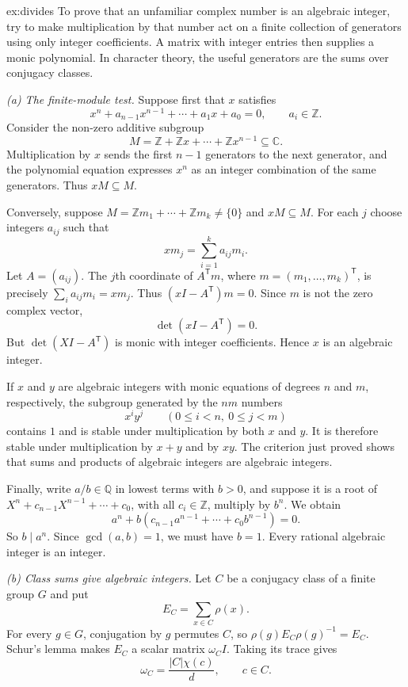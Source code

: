 \begin{solution}{ex:divides}
\idea To prove that an unfamiliar complex number is an algebraic integer, try to make multiplication by that number act on a finite collection of generators using only integer coefficients. A matrix with integer entries then supplies a monic polynomial. In character theory, the useful generators are the sums over conjugacy classes.

\writeup \emph{(a) The finite-module test.}
Suppose first that $x$ satisfies
\[
x^n+a_{n-1}x^{n-1}+\cdots+a_1x+a_0=0,
\qquad a_i\in\mathbb Z.
\]
Consider the non-zero additive subgroup
\[
M=\mathbb Z+\mathbb Zx+\cdots+\mathbb Zx^{n-1}\subseteq\mathbb C.
\]
Multiplication by $x$ sends the first $n-1$ generators to the next generator, and the polynomial equation expresses $x^n$ as an integer combination of the same generators. Thus $xM\subseteq M$.

Conversely, suppose $M=\mathbb Zm_1+\cdots+\mathbb Zm_k\ne\{0\}$ and $xM\subseteq M$. For each $j$ choose integers $a_{ij}$ such that
\[
xm_j=\sum_{i=1}^k a_{ij}m_i.
\]
Let $A=(a_{ij})$. The $j$th coordinate of $A^{\mathsf T}m$, where $m=(m_1,\ldots,m_k)^{\mathsf T}$, is precisely $\sum_i a_{ij}m_i=xm_j$. Thus $(xI-A^{\mathsf T})m=0$. Since $m$ is not the zero complex vector,
\[
\det(xI-A^{\mathsf T})=0.
\]
But $\det(XI-A^{\mathsf T})$ is monic with integer coefficients. Hence $x$ is an algebraic integer.

If $x$ and $y$ are algebraic integers with monic equations of degrees $n$ and $m$, respectively, the subgroup generated by the $nm$ numbers
\[
x^iy^j\qquad(0\le i<n,\ 0\le j<m)
\]
contains $1$ and is stable under multiplication by both $x$ and $y$. It is therefore stable under multiplication by $x+y$ and by $xy$. The criterion just proved shows that sums and products of algebraic integers are algebraic integers.

Finally, write $a/b\in\mathbb Q$ in lowest terms with $b>0$, and suppose it is a root of
$X^n+c_{n-1}X^{n-1}+\cdots+c_0$, with all $c_i\in\mathbb Z$, multiply by $b^n$. We obtain
\[
a^n+b(c_{n-1}a^{n-1}+\cdots+c_0b^{n-1})=0.
\]
So $b\mid a^n$. Since $\gcd(a,b)=1$, we must have $b=1$. Every rational algebraic integer is an integer.

\emph{(b) Class sums give algebraic integers.}
Let $C$ be a conjugacy class of a finite group $G$ and put
\[
E_C=\sum_{x\in C}\rho(x).
\]
For every $g\in G$, conjugation by $g$ permutes $C$, so $\rho(g)E_C\rho(g)^{-1}=E_C$. Schur's lemma makes $E_C$ a scalar matrix $\omega_C I$. Taking its trace gives
\[
\boxed{\omega_C=\frac{|C|\chi(c)}d},\qquad c\in C.
\]


\end{solution}
